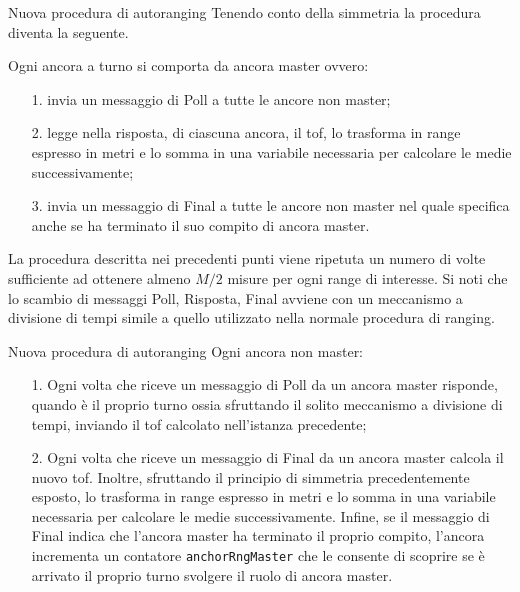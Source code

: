 \begin{frame}[shrink=10]{Nuova procedura di autoranging}
  Tenendo conto della simmetria la procedura diventa la seguente.
  \par
  Ogni ancora \alert{a turno} si comporta da ancora \alert{master}  ovvero:
  \begin{itemize}
  \item [1.] invia un messaggio di Poll a tutte le ancore \alert{non} master;
  \item [2.] legge nella risposta, di ciascuna ancora, il tof, lo trasforma in range espresso in metri e lo somma
    in una variabile necessaria per calcolare le medie successivamente;
  \item [3.] invia un messaggio di Final a tutte le ancore \alert{non} master nel quale specifica anche se ha terminato il suo compito
    di ancora master.
  \end{itemize}
  La procedura descritta nei precedenti punti viene ripetuta un numero di volte sufficiente ad ottenere almeno $M/2$ misure per
  ogni range di interesse. Si noti che lo scambio di messaggi Poll, Risposta, Final avviene con un meccanismo a divisione di tempi simile
  a quello utilizzato nella normale procedura di ranging.
\end{frame}

\begin{frame}[shrink = 10]{Nuova procedura di autoranging}
  Ogni ancora \alert{non} master:
  \begin{itemize}
  \item [1.] Ogni volta che riceve un messaggio di Poll da un ancora master risponde, quando è il proprio turno
    ossia sfruttando il solito meccanismo a divisione di tempi, inviando il tof calcolato nell'istanza precedente;
  \item [2.] Ogni volta che riceve un messaggio di Final da un ancora master calcola il nuovo tof. Inoltre,
    sfruttando il principio di simmetria precedentemente esposto, lo trasforma in range espresso in metri e lo somma
    in una variabile necessaria per calcolare le medie successivamente. Infine, se il messaggio di Final indica che l'ancora master
    ha terminato il proprio compito, l'ancora incrementa un contatore \lstinline!anchorRngMaster! che le consente di scoprire se è arrivato il proprio turno svolgere
    il ruolo di ancora master.
  \end{itemize}
\end{frame}

